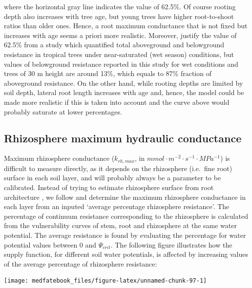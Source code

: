 \documentclass[]{book}
\begin{document}
where the horizontal gray line indicates the value of 62.5\%. Of course rooting depth also increases with tree age, but young trees have higher root-to-shoot ratios than older ones. Hence, a root maximum conductance that is not fixed but increases with age seems a priori more realistic. Moreover, \citet{Christoffersen2016} justify the value of 62.5\% from a study which quantified total aboveground and belowground resistance in tropical trees \citep{Fisher2006} under near-saturated (wet season) conditions, but values of belowground resistance reported in this study for wet conditions and trees of 30 m height are around 13\%, which equals to 87\% fraction of aboveground resistance. On the other hand, while rooting depths are limited by soil depth, lateral root length increases with age and, hence, the model could be made more realistic if this is taken into account and the curve above would probably saturate at lower percentages.

\hypertarget{rhizosphere-maximum-hydraulic-conductance}{%
\subsection{Rhizosphere maximum hydraulic conductance}\label{rhizosphere-maximum-hydraulic-conductance}}

Maximum rhizosphere conductance (\(k_{rh, max}\), in \(mmol \cdot m^{-2} \cdot s^{-1} \cdot MPa^{-1}\)) is difficult to measure directly, as it depends on the rhizosphere (i.e.~fine root) surface in each soil layer, and will probably always be a parameter to be calibrated. Instead of trying to estimate rhizosphere surface from root architecture \citep{Sperry1998}, we follow \citet{Sperry2016a} and determine the maximum rhizosphere conductance in each layer from an inputed `average percentage rhizosphere resistance'. The percentage of continuum resistance corresponding to the rhizosphere is calculated from the vulnerability curves of stem, root and rhizosphere at the same water potential. The average resistance is found by evaluating the percentage for water potential values between 0 and \(\Psi_{crit}\). The following figure illustrates how the supply function, for different soil water potentials, is affected by increasing values of the average percentage of rhizosphere resistance:

\begin{center}\texttt{[image: medfatebook\_files/figure-latex/unnamed-chunk-97-1]} \end{center}
\end{document}
